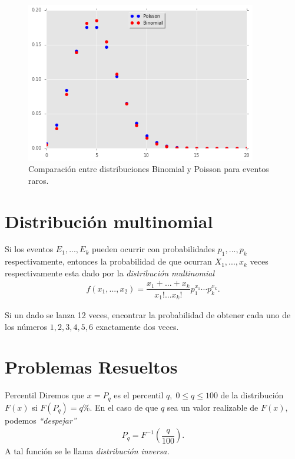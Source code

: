  \begin{figure}[h]
 \centering
 \includegraphics[height=7cm]{./pe/binVsPoi.png}
 \caption{Comparación entre distribuciones Binomial y Poisson para eventos raros.}
\end{figure}



\section{Distribución multinomial}

 Si los eventos $E_{1},...,E_{k}$ pueden ocurrir con probabilidades $p_{1},...,p_{k}$ respectivamente, entonces la probabilidad de que ocurran $X_{1},...,x_{k}$ veces respectivamente esta dado por la \emph{distribución multinomial}
 \begin{align}
  \label{eq:7.6}
  f\left( x_{1},...,x_{2} \right)=
  \dfrac{x_{1}+...+x_{k}}{x_{1}!...x_{k}!}p_{1}^{x_{1}}\cdots p_{k}^{x_{k}}.
 \end{align}



 \begin{ejemplo}
  \label{exmp:7.7}
Si un dado se lanza 12 veces, encontrar la probabilidad de obtener cada uno de los números $1,2,3,4,5,6$ exactamente dos veces.
 \end{ejemplo}



\section{Problemas Resueltos}
{Percentil}
 Diremos que $x=P_{q}$ es el percentil $q, \; 0\leq q \leq 100$ de la distribución $F(x)$ si $F(P_{q})=q\%.$  En el caso de que $q$ sea un valor realizable de $F(x),$ podemos \emph{``despejar''}
 \begin{align}
  P_{q}=F^{-1}\left( \dfrac{q}{100} \right).
 \end{align}
 A tal función se le llama \emph{distribución inversa.}


